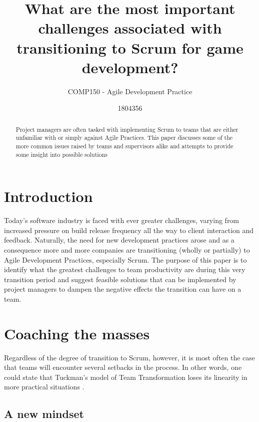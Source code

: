 \documentclass{scrartcl}
\title{What are the most important challenges associated with transitioning to Scrum for game development?}
\subtitle{COMP150 - Agile Development Practice}
\author{1804356}
\begin{document}
\maketitle

\begin{abstract}
    Project managers are often tasked with implementing Scrum to teams that are either unfamiliar with or simply against Agile Practices. This paper discusses some of the more common issues raised by teams and supervisors alike and attempts to provide some insight into possible solutions
\end{abstract}

\section{Introduction}

  Today's software industry is faced with ever greater challenges, varying from increased pressure on build release frequency all the way to client interaction and feedback. Naturally, the need for new development practices arose and as a consequence more and more companies are transitioning (wholly or partially) to Agile Development Practices, especially Scrum. The purpose of this paper is to identify what the greatest challenges to team productivity are during this very transition period and suggest feasible solutions that can be implemented by project managers to dampen the negative effects the transition can have on a team.
  
 
    \section{Coaching the masses}
    
    
     Regardless of the degree of transition to Scrum, however, it is most often the case that teams will encounter several setbacks in the process. In other words, one could state that Tuckman's model of Team Transformation loses its linearity in more practical situations \cite{4599458}. 
     
    \subsection{A new mindset}
    
\end{document}
